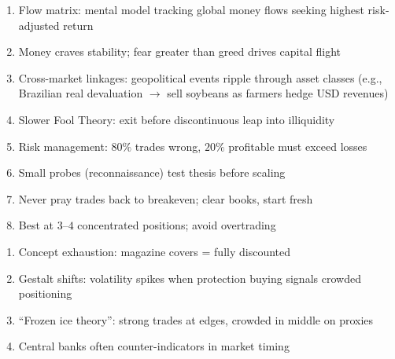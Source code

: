 \begin{remark} 
\begin{enumerate}[label=\roman*.]
\setlength{\itemsep}{0pt}
\item Flow matrix: mental model tracking global money flows seeking highest risk-adjusted return
\item Money craves stability; fear greater than greed drives capital flight
\item Cross-market linkages: geopolitical events ripple through asset classes (e.g., Brazilian real devaluation $\rightarrow$ sell soybeans as farmers hedge USD revenues)
\item Slower Fool Theory: exit before discontinuous leap into illiquidity
\item Risk management: $80\%$ trades wrong, $20\%$ profitable must exceed losses
\item Small probes (reconnaissance) test thesis before scaling
\item Never pray trades back to breakeven; clear books, start fresh
\item Best at $3$--$4$ concentrated positions; avoid overtrading
\end{enumerate}
\end{remark}

\begin{remark} 
\begin{enumerate}[label=\roman*.]
\setlength{\itemsep}{0pt}
\item Concept exhaustion: magazine covers = fully discounted
\item Gestalt shifts: volatility spikes when protection buying signals crowded positioning
\item ``Frozen ice theory'': strong trades at edges, crowded in middle on proxies
\item Central banks often counter-indicators in market timing
\end{enumerate}
\end{remark}

